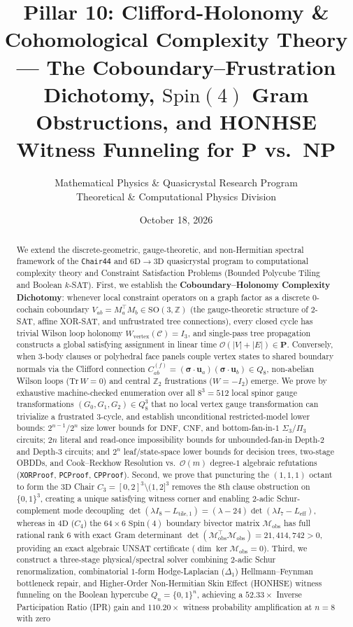 \documentclass[11pt,a4paper]{article}
\title{\textbf{Pillar 10: Clifford-Holonomy \& Cohomological Complexity Theory --- The Coboundary--Frustration Dichotomy, $\mathrm{Spin}(4)$ Gram Obstructions, and HONHSE Witness Funneling for $\mathbf{P}$ vs.\ $\mathbf{NP}$}}
\author{Mathematical Physics \& Quasicrystal Research Program \\ \small Theoretical \& Computational Physics Division}
\date{October 18, 2026}
\theoremstyle{definition}
\begin{document}
\maketitle

\begin{abstract}
We extend the discrete-geometric, gauge-theoretic, and non-Hermitian spectral framework of the \texttt{Chair44} and $6\mathrm{D}\to 3\mathrm{D}$ quasicrystal program to computational complexity theory and Constraint Satisfaction Problems (Bounded Polycube Tiling and Boolean $k$-SAT). First, we establish the \textbf{Coboundary--Holonomy Complexity Dichotomy}: whenever local constraint operators on a graph factor as a discrete $0$-cochain coboundary $V_{ab} = M_a^\top M_b \in \mathrm{SO}(3,\mathbb{Z})$ (the gauge-theoretic structure of $2$-SAT, affine XOR-SAT, and unfrustrated tree connections), every closed cycle has trivial Wilson loop holonomy $W_{\mathrm{vertex}}(\mathcal{C}) = I_3$, and single-pass tree propagation constructs a global satisfying assignment in linear time $\mathcal{O}(|V|+|E|) \in \mathbf{P}$. Conversely, when $3$-body clauses or polyhedral face panels couple vertex states to shared boundary normals via the Clifford connection $C_{ab}^{(f)} = (\boldsymbol{\sigma}\cdot\mathbf{u}_a)(\boldsymbol{\sigma}\cdot\mathbf{u}_b) \in Q_8$, non-abelian Wilson loops ($\mathrm{Tr}\,W = 0$) and central $\mathbb{Z}_2$ frustrations ($W = -I_2$) emerge. We prove by exhaustive machine-checked enumeration over all $8^3 = 512$ local spinor gauge transformations $(G_0,G_1,G_2)\in Q_8^3$ that no local vertex gauge transformation can trivialize a frustrated $3$-cycle, and establish unconditional restricted-model lower bounds: $2^{n-1}$/$2^n$ size lower bounds for $\mathrm{DNF}$, $\mathrm{CNF}$, and bottom-fan-in-$1$ $\Sigma_3$/$\Pi_3$ circuits; $2n$ literal and read-once impossibility bounds for unbounded-fan-in Depth-$2$ and Depth-$3$ circuits; and $2^n$ leaf/state-space lower bounds for decision trees, two-stage OBDDs, and Cook--Reckhow Resolution vs.\ $\mathcal{O}(m)$ degree-$1$ algebraic refutations (\texttt{XORProof}, \texttt{PCProof}, \texttt{CPProof}). Second, we prove that puncturing the $(1,1,1)$ octant to form the $3\mathrm{D}$ Chair $C_3 = [0,2]^3\setminus(1,2]^3$ removes the $8$th clause obstruction on $\{0,1\}^3$, creating a unique satisfying witness corner and enabling $2$-adic Schur-complement mode decoupling $\det(\lambda I_8 - L_{\mathrm{tile},1}) = (\lambda - 24)\det(\lambda I_7 - L_{\mathrm{eff}})$, whereas in $4\mathrm{D}$ ($C_4$) the $64\times 6$ $\mathrm{Spin}(4)$ boundary bivector matrix $\mathcal{M}_{\mathrm{obs}}$ has full rational rank $6$ with exact Gram determinant $\det(\mathcal{M}_{\mathrm{obs}}^\top \mathcal{M}_{\mathrm{obs}}) = 21{,}414{,}742 > 0$, providing an exact algebraic UNSAT certificate ($\dim\ker\mathcal{M}_{\mathrm{obs}} = 0$). Third, we construct a three-stage physical/spectral solver combining $2$-adic Schur renormalization, combinatorial $1$-form Hodge-Laplacian ($\Delta_1$) Hellmann--Feynman bottleneck repair, and Higher-Order Non-Hermitian Skin Effect (HONHSE) witness funneling on the Boolean hypercube $Q_n = \{0,1\}^n$, achieving a $52.33\times$ Inverse Participation Ratio (IPR) gain and $110.20\times$ witness probability amplification at $n=8$ with zero 
\end{abstract}
\end{document}
